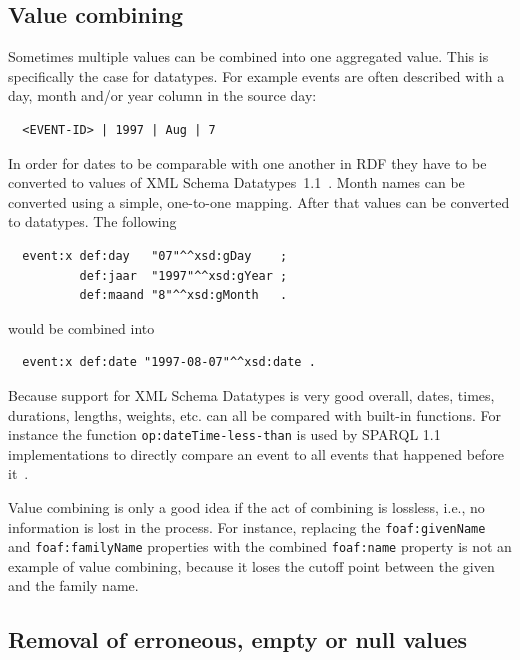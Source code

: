 \documentclass[a4paper]{scrartcl}
\newcommand{\textt}[1]{{\small \texttt{#1}}}
\begin{document}
\subsection{Value combining}
\label{sec:value_combining}

Sometimes multiple values can be combined into one aggregated value.
This is specifically the case for datatypes.  For example events are
often described with a day, month and/or year column in the source
day:

\begin{verbatim}
  <EVENT-ID> | 1997 | Aug | 7
\end{verbatim}

In order for dates to be comparable with one another in RDF they have
to be converted to values of XML Schema
Datatypes~1.1~\cite{Peterson2012}.  Month names can be converted using
a simple, one-to-one mapping.  After that values can be converted
to datatypes.  The following

\begin{verbatim}
  event:x def:day   "07"^^xsd:gDay    ;
          def:jaar  "1997"^^xsd:gYear ;
          def:maand "8"^^xsd:gMonth   .
\end{verbatim}

would be combined into

\begin{verbatim}
  event:x def:date "1997-08-07"^^xsd:date .
\end{verbatim}

Because support for XML Schema Datatypes is very good overall, dates,
times, durations, lengths, weights, etc. can all be compared with
built-in functions.  For instance the function
\textt{op:dateTime-less-than} is used by SPARQL 1.1 implementations to
directly compare an event to all events that happened before
it~\cite{Malhotra2015}.

Value combining is only a good idea if the act of combining is
lossless, i.e., no information is lost in the process.  For instance,
replacing the \textt{foaf:givenName} and \textt{foaf:familyName}
properties with the combined \textt{foaf:name} property is not an
example of value combining, because it loses the cutoff point between
the given and the family name.


\subsection{Removal of erroneous, empty or null values}
\label{sec:null}
\end{document}
